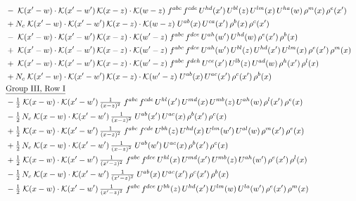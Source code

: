 \documentclass[9pt]{article}
\begin{document}
\begin{align}
&\quad -\;\mathcal{K}(x'-w)\cdot\mathcal{K}(x'-w')\,\mathcal{K}(x-z)\cdot\mathcal{K}(w-z)\;f^{abc}\,f^{cde}\,U^{hd}(x')\,U^{bl}(z)\,U^{lm}(x)\,U^{ha}(w)\,\rho^{m}(x)\,\rho^{e}(x')\notag\\
&\quad +N_c\;\mathcal{K}(x'-w)\cdot\mathcal{K}(x'-w')\,\mathcal{K}(x-z)\cdot\mathcal{K}(w-z)\;U^{ab}(x)\,U^{ca}(x')\,\rho^{b}(x)\,\rho^{c}(x')\notag\\
&\quad -\;\mathcal{K}(x'-w)\cdot\mathcal{K}(x'-w')\,\mathcal{K}(x-z)\cdot\mathcal{K}(w'-z)\;f^{abc}\,f^{dce}\,U^{ah}(w')\,U^{hd}(w)\,\rho^{e}(x')\,\rho^{b}(x)\notag\\
&\quad +\;\mathcal{K}(x'-w)\cdot\mathcal{K}(x'-w')\,\mathcal{K}(x-z)\cdot\mathcal{K}(w'-z)\;f^{abc}\,f^{dce}\,U^{ah}(w')\,U^{bl}(z)\,U^{hd}(x')\,U^{lm}(x)\,\rho^{e}(x')\,\rho^{m}(x)\notag\\
&\quad +\;\mathcal{K}(x'-w)\cdot\mathcal{K}(x'-w')\,\mathcal{K}(x-z)\cdot\mathcal{K}(w'-z)\;f^{abc}\,f^{deh}\,U^{ce}(x')\,U^{lb}(z)\,U^{ad}(w)\,\rho^{h}(x')\,\rho^{l}(x)\notag\\
&\quad +N_c\;\mathcal{K}(x'-w)\cdot\mathcal{K}(x'-w')\,\mathcal{K}(x-z)\cdot\mathcal{K}(w'-z)\;U^{ab}(x)\,U^{ac}(x')\,\rho^{c}(x')\,\rho^{b}(x)\notag\\
&\quad\underline{\text{Group III, Row I}}\notag\\
&\quad -\tfrac{1}{2}\;\mathcal{K}(x-w)\cdot\mathcal{K}(x'-w')\,\tfrac{1}{(x-z)^{2}}\;f^{abc}\,f^{cde}\,U^{hl}(x')\,U^{md}(x)\,U^{mb}(z)\,U^{ah}(w)\,\rho^{l}(x')\,\rho^{e}(x)\notag\\
&\quad -\tfrac{1}{2}\,N_c\;\mathcal{K}(x-w)\cdot\mathcal{K}(x'-w')\,\tfrac{1}{(x-z)^{2}}\;U^{ab}(x')\,U^{ac}(x)\,\rho^{b}(x')\,\rho^{c}(x)\notag\\
&\quad +\tfrac{1}{2}\;\mathcal{K}(x-w)\cdot\mathcal{K}(x'-w')\,\tfrac{1}{(x-z)^{2}}\;f^{abc}\,f^{cde}\,U^{bh}(z)\,U^{hd}(x)\,U^{lm}(w')\,U^{al}(w)\,\rho^{m}(x')\,\rho^{e}(x)\notag\\
&\quad +\tfrac{1}{2}\,N_c\;\mathcal{K}(x-w)\cdot\mathcal{K}(x'-w')\,\tfrac{1}{(x-z)^{2}}\;U^{ab}(w')\,U^{ac}(x)\,\rho^{b}(x')\,\rho^{c}(x)\notag\\
&\quad +\tfrac{1}{2}\;\mathcal{K}(x-w)\cdot\mathcal{K}(x'-w')\,\tfrac{1}{(x'-z)^{2}}\;f^{abc}\,f^{dce}\,U^{hl}(x)\,U^{md}(x')\,U^{mb}(z)\,U^{ah}(w')\,\rho^{e}(x')\,\rho^{l}(x)\notag\\
&\quad -\tfrac{1}{2}\,N_c\;\mathcal{K}(x-w)\cdot\mathcal{K}(x'-w')\,\tfrac{1}{(x'-z)^{2}}\;U^{ab}(x)\,U^{ac}(x')\,\rho^{c}(x')\,\rho^{b}(x)\notag\\
&\quad -\tfrac{1}{2}\;\mathcal{K}(x-w)\cdot\mathcal{K}(x'-w')\,\tfrac{1}{(x'-z)^{2}}\;f^{abc}\,f^{dce}\,U^{bh}(z)\,U^{hd}(x')\,U^{lm}(w)\,U^{la}(w')\,\rho^{e}(x')\,\rho^{m}(x)\notag\\

\end{align}
\end{document}
